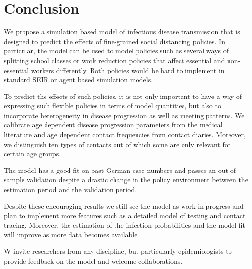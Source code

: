 \section{Conclusion}
\label{sec:conclusion}

We propose a simulation based model of infectious disease transmission that is designed to predict the effects of fine-grained social distancing policies. In particular, the model can be used to model policies such as several ways of splitting school classes or work reduction policies that affect essential and non-essential workers differently. Both policies would be hard to implement in standard SEIR or agent based simulation models.

To predict the effects of such policies, it is not only important to have a way of expressing such flexible policies in terms of model quantities, but also to incorporate heterogeneity in disease progression as well as meeting patterns. We calibrate age dependent disease progression parameters from the medical literature and age dependent contact frequencies from contact diaries. Moreover, we distinguish ten types of contacts out of which some are only relevant for certain age groups.

The model has a good fit on past German case numbers and passes an out of sample validation despite a drastic change in the policy environment between the estimation period and the validation period.

Despite these encouraging results we still see the model as work in progress and plan to implement more features such as a detailed model of testing and contact tracing. Moreover, the estimation of the infection probabilities and the model fit will improve as more data becomes available.

W invite researchers from any discipline, but particularly epidemiologists to provide feedback on the model and welcome collaborations.
